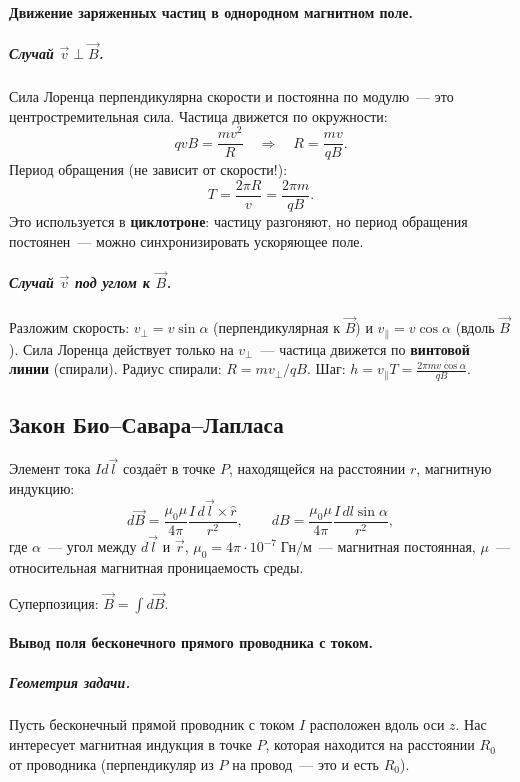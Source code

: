 \documentclass[12pt]{article}
\begin{document}
\paragraph{Движение заряженных частиц в однородном магнитном поле.}

\subparagraph{Случай $\vec{v} \perp \vec{B}$.}
Сила Лоренца перпендикулярна скорости и постоянна по модулю~--- это
центростремительная сила. Частица движется по окружности:
\[
    qvB = \frac{mv^2}{R} \quad\Longrightarrow\quad R = \frac{mv}{qB}.
\]
Период обращения (не зависит от скорости!):
\[
    T = \frac{2\pi R}{v} = \frac{2\pi m}{qB}.
\]
Это используется в \textbf{циклотроне}: частицу разгоняют, но период обращения
постоянен~--- можно синхронизировать ускоряющее поле.

\subparagraph{Случай $\vec{v}$ под углом к $\vec{B}$.}
Разложим скорость: $v_\perp = v\sin\alpha$ (перпендикулярная к $\vec{B}$) и
$v_\parallel = v\cos\alpha$ (вдоль $\vec{B}$). Сила Лоренца действует только на
$v_\perp$~--- частица движется по \textbf{винтовой линии} (спирали). Радиус
спирали: $R = mv_\perp / qB$. Шаг: $h = v_\parallel T = \frac{2\pi m
v\cos\alpha}{qB}$.

\subsection{Закон Био--Савара--Лапласа}

\begin{law}
    Элемент тока $Id\vec{l}$ создаёт в точке $P$, находящейся на расстоянии
    $r$, магнитную индукцию:
    \[
        d\vec{B} = \frac{\mu_0\mu}{4\pi}\frac{I\,d\vec{l}\times\hat{r}}{r^2},
        \qquad dB = \frac{\mu_0\mu}{4\pi}\frac{I\,dl\sin\alpha}{r^2},
    \]
    где $\alpha$~--- угол между $d\vec{l}$ и $\vec{r}$,
    $\mu_0 = 4\pi\cdot10^{-7}\;\text{Гн/м}$~--- магнитная постоянная,
    $\mu$~--- относительная магнитная проницаемость среды.

    Суперпозиция: $\vec{B} = \int d\vec{B}$.
\end{law}

\paragraph{Вывод поля бесконечного прямого проводника с током.}

\subparagraph{Геометрия задачи.}
Пусть бесконечный прямой проводник с током $I$ расположен вдоль оси $z$.
Нас интересует магнитная индукция в точке $P$, которая находится на
расстоянии $R_0$ от проводника (перпендикуляр из $P$ на провод~--- это
и есть $R_0$).
\end{document}
